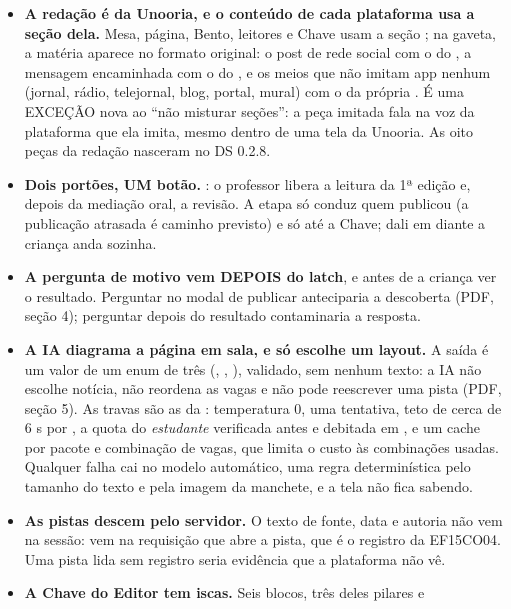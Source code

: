\begin{itemize}
  \item \textbf{A redação é da Unooria, e o conteúdo de cada plataforma usa a seção
    dela.} Mesa, página, Bento, leitores e Chave usam a seção ; na
    gaveta, a matéria aparece no formato original: o post de rede social com o
     do , a mensagem encaminhada com o
     do , e os meios que não imitam app
    nenhum (jornal, rádio, telejornal, blog, portal, mural) com o
     da própria . É uma EXCEÇÃO nova ao \enquote{não
    misturar seções}: a peça imitada fala na voz da plataforma que ela imita,
    mesmo dentro de uma tela da Unooria. As oito peças da redação nasceram no DS
    0.2.8.
  \item \textbf{Dois portões, UM botão.}  \seta{} 
    \seta{} : o professor libera a leitura da 1ª edição e, depois da
    mediação oral, a revisão. A etapa só conduz quem publicou (a publicação
    atrasada é caminho previsto) e só até a Chave; dali em diante a criança anda
    sozinha.
  \item \textbf{A pergunta de motivo vem DEPOIS do latch}, e antes de a criança ver
    o resultado. Perguntar no modal de publicar anteciparia a descoberta (PDF,
    seção 4); perguntar depois do resultado contaminaria a resposta.
  \item \textbf{A IA diagrama a página em sala, e só escolhe um layout.} A saída é
    um valor de um enum de três (, , ),
    validado, sem nenhum texto: a IA não escolhe notícia, não reordena as vagas e
    não pode reescrever uma pista (PDF, seção 5). As travas são as da
    : temperatura 0, uma tentativa, teto de cerca de 6 s por
    , a quota do \emph{estudante} verificada antes e debitada em
    , e um cache por pacote e combinação de vagas, que limita o
    custo às combinações usadas. Qualquer falha cai no modelo automático, uma
    regra determinística pelo tamanho do texto e pela imagem da manchete, e a
    tela não fica sabendo.
  \item \textbf{As pistas descem pelo servidor.} O texto de fonte, data e autoria
    não vem na sessão: vem na requisição que abre a pista, que é o registro da
    EF15CO04. Uma pista lida sem registro seria evidência que a plataforma não vê.
  \item \textbf{A Chave do Editor tem iscas.} Seis blocos, três deles pilares e

\end{itemize}
